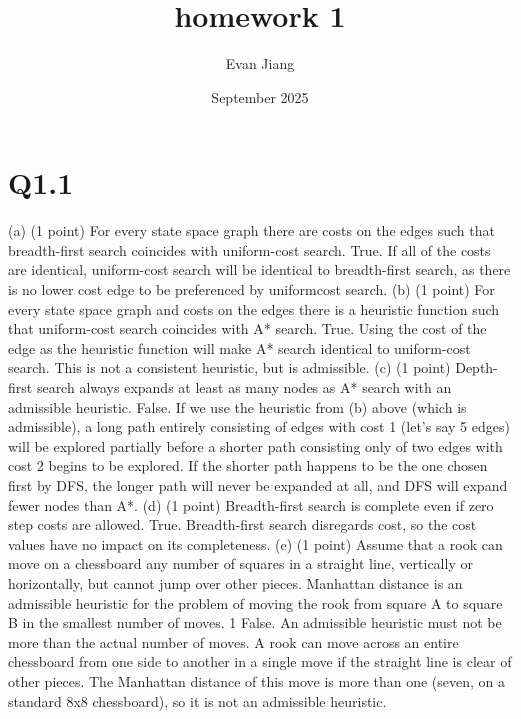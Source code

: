 \documentclass{article}
\title{homework 1}
\author{Evan Jiang}
\date{September 2025}
\begin{document}
\maketitle

\section{Q1.1}

(a) (1 point) For every state space graph there are costs on the edges such that
breadth-first search coincides with uniform-cost search.
True. If all of the costs are identical, uniform-cost search will be identical to
breadth-first search, as there is no lower cost edge to be preferenced by uniformcost search.
(b) (1 point) For every state space graph and costs on the edges there is a heuristic
function such that uniform-cost search coincides with A* search.
True. Using the cost of the edge as the heuristic function will make A* search
identical to uniform-cost search. This is not a consistent heuristic, but is admissible.
(c) (1 point) Depth-first search always expands at least as many nodes as A* search
with an admissible heuristic.
False. If we use the heuristic from (b) above (which is admissible), a long
path entirely consisting of edges with cost 1 (let’s say 5 edges) will be explored
partially before a shorter path consisting only of two edges with cost 2 begins
to be explored. If the shorter path happens to be the one chosen first by DFS,
the longer path will never be expanded at all, and DFS will expand fewer nodes
than A*.
(d) (1 point) Breadth-first search is complete even if zero step costs are allowed.
True. Breadth-first search disregards cost, so the cost values have no impact on
its completeness.
(e) (1 point) Assume that a rook can move on a chessboard any number of squares
in a straight line, vertically or horizontally, but cannot jump over other pieces.
Manhattan distance is an admissible heuristic for the problem of moving the
rook from square A to square B in the smallest number of moves.
1
False. An admissible heuristic must not be more than the actual number of
moves. A rook can move across an entire chessboard from one side to another in
a single move if the straight line is clear of other pieces. The Manhattan distance
of this move is more than one (seven, on a standard 8x8 chessboard), so it is not
an admissible heuristic.
\end{document}
